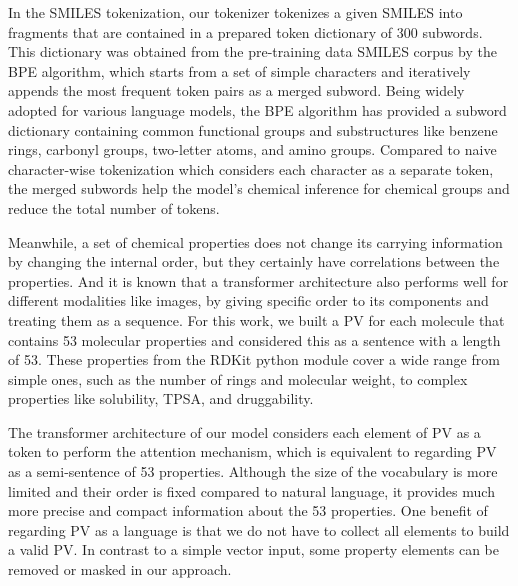 \documentclass{nature_meth}
\newcommand{\1}{\blmath{1}}
\newcommand{\0}{\blmath{0}}
\begin{document}
In the SMILES tokenization, our tokenizer tokenizes a given SMILES into fragments that are contained in a prepared token dictionary of 300 subwords. This dictionary was obtained from the pre-training data SMILES corpus by the BPE algorithm\cite{bpe}, which starts from a set of simple characters and iteratively appends the most frequent token pairs as a merged subword. Being widely adopted for various language models\cite{roberta,t5}, the BPE algorithm has provided a subword dictionary containing common functional groups and substructures like benzene rings, carbonyl groups, two-letter atoms, and amino groups. Compared to naive character-wise tokenization which considers each character as a separate token, the merged subwords help the model's chemical inference for chemical groups and reduce the total number of tokens.

Meanwhile, a set of chemical properties does not change its carrying information by changing the internal order, but they certainly have correlations between the properties. And it is known that a transformer architecture also performs well for different modalities like images, by giving specific order to its components and treating them as a sequence. For this work, we built a PV for each molecule that contains 53 molecular properties and considered this as a sentence with a length of 53. These properties from the RDKit python module\cite{rdkit} cover a wide range from simple ones, such as the number of rings and molecular weight, to complex properties like solubility, TPSA, and druggability. 

The transformer architecture of our model considers each element of PV as a token to perform the attention mechanism, which is equivalent to regarding PV as a semi-sentence of 53 properties. Although the size of the vocabulary is more limited and their order is fixed compared to natural language, it provides much more precise and compact information about the 53 properties.
One benefit of regarding PV as a language is that we do not have to collect all elements to build a valid PV. In contrast to a simple vector input, some property elements can be removed or masked in our approach.
\end{document}

